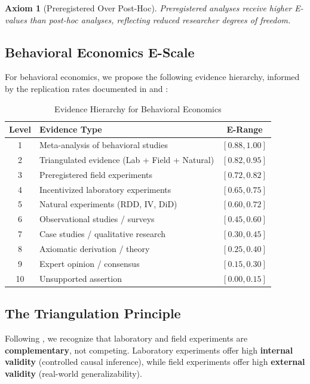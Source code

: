 \documentclass[11pt,a4paper]{article}
\newtheorem{axiom}{Axiom}
\begin{document}
\begin{axiom}[Preregistered Over Post-Hoc]
Preregistered analyses receive higher E-values than post-hoc analyses,
reflecting reduced researcher degrees of freedom.
\end{axiom}

\subsection{Behavioral Economics E-Scale}

For behavioral economics, we propose the following evidence hierarchy,
informed by the replication rates documented in \citet{Camerer2016} and
\citet{Camerer2018}:

\begin{table}[h]
\centering
\caption{Evidence Hierarchy for Behavioral Economics}
\label{tab:E-scale}
\begin{tabular}{clc}
\toprule
\textbf{Level} & \textbf{Evidence Type} & \textbf{E-Range} \\
\midrule
1 & Meta-analysis of behavioral studies & $[0.88, 1.00]$ \\
2 & Triangulated evidence (Lab + Field + Natural) & $[0.82, 0.95]$ \\
3 & Preregistered field experiments & $[0.72, 0.82]$ \\
4 & Incentivized laboratory experiments & $[0.65, 0.75]$ \\
5 & Natural experiments (RDD, IV, DiD) & $[0.60, 0.72]$ \\
6 & Observational studies / surveys & $[0.45, 0.60]$ \\
7 & Case studies / qualitative research & $[0.30, 0.45]$ \\
8 & Axiomatic derivation / theory & $[0.25, 0.40]$ \\
9 & Expert opinion / consensus & $[0.15, 0.30]$ \\
10 & Unsupported assertion & $[0.00, 0.15]$ \\
\bottomrule
\end{tabular}
\end{table}

\subsection{The Triangulation Principle}

Following \citet{FalkHeckman2009}, we recognize that laboratory and field
experiments are \textbf{complementary}, not competing. Laboratory experiments
offer high \textbf{internal validity} (controlled causal inference), while
field experiments offer high \textbf{external validity} (real-world
generalizability).
\end{document}
